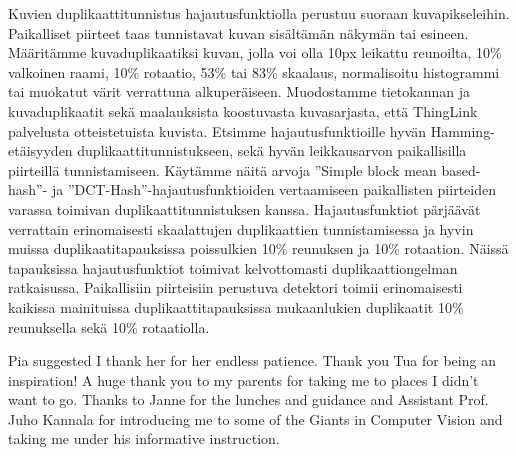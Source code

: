 \documentclass[english,12pt,a4paper,pdftex,elec,utf8, table]{aaltothesis}
\begin{document}
\newpage
%

\begin{abstractpage}[finnish]
  Kuvien duplikaattitunnistus hajautusfunktiolla perustuu suoraan kuvapikseleihin. Paikalliset piirteet taas tunnistavat kuvan sisältämän näkymän tai esineen. Määritämme kuvaduplikaatiksi kuvan, jolla voi olla 10px leikattu reunoilta, 10\% valkoinen raami, 10\% rotaatio, 53\% tai 83\% skaalaus, normalisoitu histogrammi tai muokatut värit verrattuna alkuperäiseen. Muodostamme tietokannan ja kuvaduplikaatit sekä maalauksista koostuvasta kuvasarjasta, että ThingLink palvelusta otteistetuista kuvista. Etsimme hajautusfunktioille hyvän Hamming-etäisyyden duplikaattitunnistukseen, sekä hyvän leikkausarvon paikallisilla piirteillä tunnistamiseen. Käytämme näitä arvoja ''Simple block mean based-hash''- ja ''DCT-Hash''-hajautusfunktioiden vertaamiseen paikallisten piirteiden varassa toimivan duplikaattitunnistuksen kanssa. Hajautusfunktiot pärjäävät verrattain erinomaisesti skaalattujen duplikaattien tunnistamisessa ja hyvin muissa duplikaatitapauksissa poissulkien 10\% reunuksen ja 10\% rotaation. Näissä tapauksissa hajautusfunktiot toimivat kelvottomasti duplikaattiongelman ratkaisussa. Paikallisiin piirteisiin perustuva detektori toimii erinomaisesti kaikissa mainituissa duplikaattitapauksissa mukaanlukien duplikaatit 10\% reunuksella sekä 10\% rotaatiolla.
\end{abstractpage}

\newpage

Pia suggested I thank her for her endless patience. Thank you Tua for being an inspiration! A huge thank you to my parents for taking me to places I didn't want to go. Thanks to Janne for the lunches and guidance and Assistant Prof. Juho Kannala for introducing me to some of the Giants in Computer Vision and taking me under his informative instruction.\\
\end{document}
